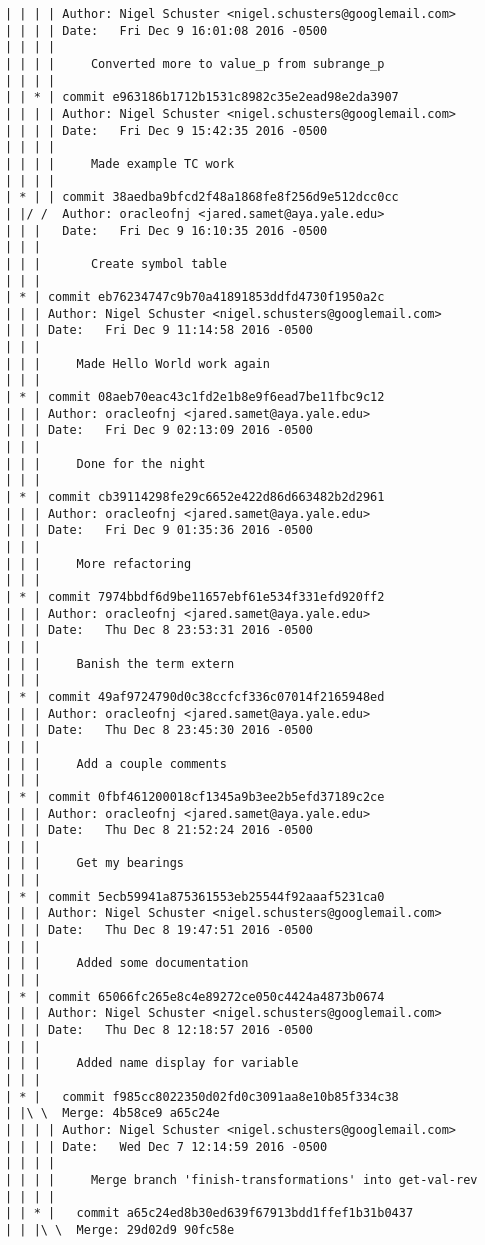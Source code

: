 \begin{lstlisting}
| | | | Author: Nigel Schuster <nigel.schusters@googlemail.com>
| | | | Date:   Fri Dec 9 16:01:08 2016 -0500
| | | | 
| | | |     Converted more to value_p from subrange_p
| | | |     
| | * | commit e963186b1712b1531c8982c35e2ead98e2da3907
| | | | Author: Nigel Schuster <nigel.schusters@googlemail.com>
| | | | Date:   Fri Dec 9 15:42:35 2016 -0500
| | | | 
| | | |     Made example TC work
| | | |     
| * | | commit 38aedba9bfcd2f48a1868fe8f256d9e512dcc0cc
| |/ /  Author: oracleofnj <jared.samet@aya.yale.edu>
| | |   Date:   Fri Dec 9 16:10:35 2016 -0500
| | |   
| | |       Create symbol table
| | |    
| * | commit eb76234747c9b70a41891853ddfd4730f1950a2c
| | | Author: Nigel Schuster <nigel.schusters@googlemail.com>
| | | Date:   Fri Dec 9 11:14:58 2016 -0500
| | | 
| | |     Made Hello World work again
| | |    
| * | commit 08aeb70eac43c1fd2e1b8e9f6ead7be11fbc9c12
| | | Author: oracleofnj <jared.samet@aya.yale.edu>
| | | Date:   Fri Dec 9 02:13:09 2016 -0500
| | | 
| | |     Done for the night
| | |    
| * | commit cb39114298fe29c6652e422d86d663482b2d2961
| | | Author: oracleofnj <jared.samet@aya.yale.edu>
| | | Date:   Fri Dec 9 01:35:36 2016 -0500
| | | 
| | |     More refactoring
| | |    
| * | commit 7974bbdf6d9be11657ebf61e534f331efd920ff2
| | | Author: oracleofnj <jared.samet@aya.yale.edu>
| | | Date:   Thu Dec 8 23:53:31 2016 -0500
| | | 
| | |     Banish the term extern
| | |    
| * | commit 49af9724790d0c38ccfcf336c07014f2165948ed
| | | Author: oracleofnj <jared.samet@aya.yale.edu>
| | | Date:   Thu Dec 8 23:45:30 2016 -0500
| | | 
| | |     Add a couple comments
| | |    
| * | commit 0fbf461200018cf1345a9b3ee2b5efd37189c2ce
| | | Author: oracleofnj <jared.samet@aya.yale.edu>
| | | Date:   Thu Dec 8 21:52:24 2016 -0500
| | | 
| | |     Get my bearings
| | |    
| * | commit 5ecb59941a875361553eb25544f92aaaf5231ca0
| | | Author: Nigel Schuster <nigel.schusters@googlemail.com>
| | | Date:   Thu Dec 8 19:47:51 2016 -0500
| | | 
| | |     Added some documentation
| | |    
| * | commit 65066fc265e8c4e89272ce050c4424a4873b0674
| | | Author: Nigel Schuster <nigel.schusters@googlemail.com>
| | | Date:   Thu Dec 8 12:18:57 2016 -0500
| | | 
| | |     Added name display for variable
| | |      
| * |   commit f985cc8022350d02fd0c3091aa8e10b85f334c38
| |\ \  Merge: 4b58ce9 a65c24e
| | | | Author: Nigel Schuster <nigel.schusters@googlemail.com>
| | | | Date:   Wed Dec 7 12:14:59 2016 -0500
| | | | 
| | | |     Merge branch 'finish-transformations' into get-val-rev
| | | |       
| | * |   commit a65c24ed8b30ed639f67913bdd1ffef1b31b0437
| | |\ \  Merge: 29d02d9 90fc58e

\end{lstlisting}

